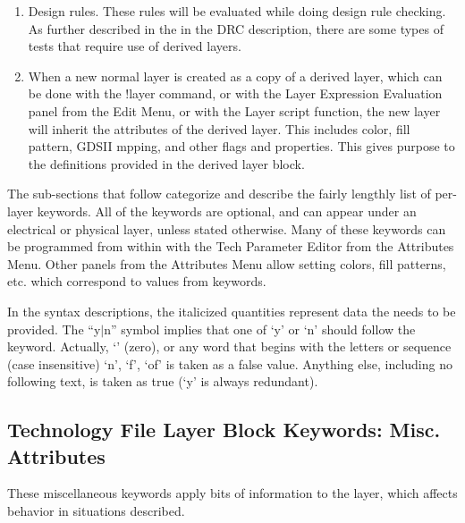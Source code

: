 \begin{description}
\begin{enumerate}
\item{Design rules.  These rules will be evaluated while doing design
rule checking.  As further described in the in the DRC description,
there are some types of tests that require use of derived layers.}

\item{When a new normal layer is created as a copy of a derived layer,
which can be done with the {\cb !layer} command, or with the {\cb
Layer Expression Evaluation} panel from the {\cb Edit Menu}, or with
the {\vt Layer} script function, the new layer will inherit the
attributes of the derived layer.  This includes color, fill pattern,
GDSII mpping, and other flags and properties.  This gives purpose to
the definitions provided in the derived layer block.}
\end{enumerate}
\end{description}

The sub-sections that follow categorize and describe the fairly
lengthly list of per-layer keywords.  All of the keywords are
optional, and can appear under an electrical or physical layer, unless
stated otherwise.  Many of these keywords can be programmed from
within {\Xic} with the {\cb Tech Parameter Editor} from the {\cb
Attributes Menu}.  Other panels from the {\cb Attributes Menu} allow
setting colors, fill patterns, etc.  which correspond to values from
keywords.

In the syntax descriptions, the italicized quantities represent data
the needs to be provided.  The ``{\vt y}$|${\vt n}'' symbol implies that
one of `{\vt y}' or `{\vt n}' should follow the keyword.  Actually,
`{}' (zero), or any word that begins with the letters or sequence
(case insensitive) `{\vt n}', `{\vt f}', `{\vt of}' is taken as a
false value.  Anything else, including no following text, is taken as
true (`{\vt y}' is always redundant).


\subsection{Technology File Layer Block Keywords:  Misc. Attributes}
\label{misclattr}

These miscellaneous keywords apply bits of information to the layer,
which affects behavior in situations described.

